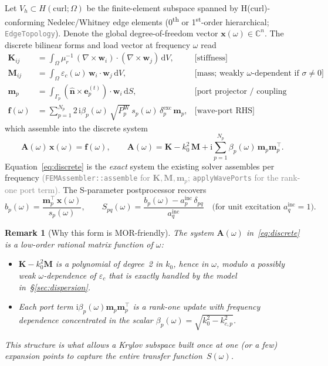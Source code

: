 \documentclass[11pt,a4paper]{article}
\newcommand{\C}{\mathbb{C}}
\newcommand{\im}{\mathrm{i}}
\newtheorem{remark}{Remark}
\begin{document}
Let $V_h\subset H(\mathrm{curl};\Omega)$ be the finite-element subspace
spanned by H(curl)-conforming Nedelec/Whitney edge elements
(0\textsuperscript{th} or 1\textsuperscript{st}-order hierarchical;
\textcolor{gray}{\texttt{EdgeTopology}}). Denote the global degree-of-freedom
vector $\bm x(\omega)\in\C^{n}$. The discrete bilinear forms and load
vector at frequency $\omega$ read
\begin{align}
  \bm K_{ij} &= \int_\Omega \mu_r^{-1}\,(\nabla\times\bm w_i)\cdot
                 (\nabla\times\bm w_j)\,\mathrm dV,
  & \text{[stiffness]}\\
  \bm M_{ij} &= \int_\Omega \varepsilon_c(\omega)\,\bm w_i\cdot\bm w_j\,\mathrm dV,
  & \text{[mass; weakly $\omega$-dependent if $\sigma\!\neq\!0$]}\\
  \bm m_p    &= \int_{\Gamma_p}(\hat{\bm n}\times\bm e_p^{(t)})\cdot\bm w_i\,\mathrm dS,
  & \text{[port projector / coupling vector]}\\
  \bm f(\omega) &= \sum_{p=1}^{N_p} 2\,\im\beta_p(\omega)\,\sqrt{P_p^{\mathrm W}}\,s_p(\omega)\,\delta_p^{\mathrm{exc}}\,\bm m_p,
  & \text{[wave-port RHS]}
\end{align}
which assemble into the discrete system
\begin{equation}
  \boxed{\;
  \bm A(\omega)\,\bm x(\omega) = \bm f(\omega),\qquad
  \bm A(\omega) = \bm K - k_0^2\,\bm M
  + \im\sum_{p=1}^{N_p} \beta_p(\omega)\,\bm m_p \bm m_p^{\!\top}.
  \;}
  \label{eq:discrete}
\end{equation}
Equation~\eqref{eq:discrete} is the \emph{exact} system the existing
solver assembles per frequency
\textcolor{gray}{(\texttt{FEMAssembler::assemble} for $\bm K,\bm M,\bm m_p$;
\texttt{applyWavePorts} for the rank-one port term).}
The S-parameter postprocessor recovers
\begin{equation}
  b_p(\omega) = \frac{\bm m_p^{\!\top}\,\bm x(\omega)}{s_p(\omega)},
  \qquad
  S_{pq}(\omega) = \frac{b_p(\omega)-a_p^{\mathrm{inc}}\,\delta_{pq}}{a_q^{\mathrm{inc}}}
  \quad\text{(for unit excitation $a_q^{\mathrm{inc}}=1$).}
  \label{eq:sparam}
\end{equation}

\begin{remark}[Why this form is MOR-friendly]
The system $\bm A(\omega)$ in~\eqref{eq:discrete} is a low-order
\emph{rational matrix function} of $\omega$:
\begin{itemize}
  \item $\bm K - k_0^2\bm M$ is a polynomial of degree~2 in $k_0$, hence in
        $\omega$, modulo a possibly weak $\omega$-dependence of
        $\varepsilon_c$ that is exactly handled by the model
        in~\S\ref{sec:dispersion}.
  \item Each port term $\im\beta_p(\omega)\bm m_p\bm m_p^{\!\top}$ is a
        rank-one update with frequency dependence concentrated in the scalar
        $\beta_p(\omega)=\sqrt{k_0^2-k_{c,p}^2}$.
\end{itemize}
This structure is what allows a Krylov subspace built once at one (or a
few) expansion points to capture the entire transfer function~$S(\omega)$.
\end{remark}
\end{document}
